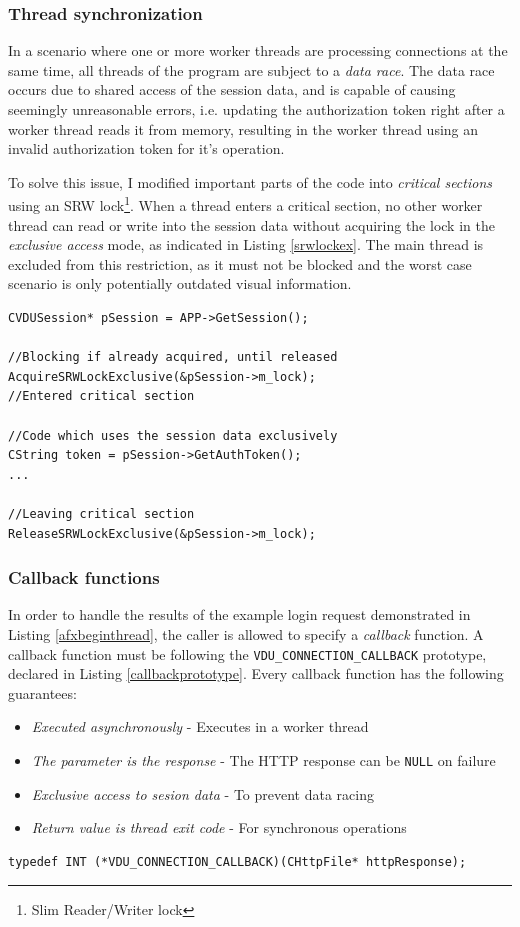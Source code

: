 \subsubsection{Thread synchronization}
In a scenario where one or more worker threads are processing connections at the same time, all threads of the program are subject to a \textit{data race}. The data race occurs due to shared access of the session data, and is capable of causing seemingly unreasonable errors, i.e. updating the authorization token right after a worker thread reads it from memory, resulting in the worker thread using an invalid authorization token for it's operation.

To solve this issue, I modified important parts of the code into \textit{critical sections} using an SRW lock\footnote{Slim Reader/Writer lock}. When a thread enters a critical section, no other worker thread can read or write into the session data without acquiring the lock in the \textit{exclusive access} mode, as indicated in Listing \ref{srwlockex}. The main thread is excluded from this restriction, as it must not be blocked and the worst case scenario is only potentially outdated visual information.

\begin{lstlisting}[caption={Example of a critical section implementation using an SRW lock.}, label=srwlockex]
CVDUSession* pSession = APP->GetSession();

//Blocking if already acquired, until released
AcquireSRWLockExclusive(&pSession->m_lock);
//Entered critical section

//Code which uses the session data exclusively
CString token = pSession->GetAuthToken();
...

//Leaving critical section
ReleaseSRWLockExclusive(&pSession->m_lock);
\end{lstlisting}

\subsubsection{Callback functions}
In order to handle the results of the example login request demonstrated in Listing \ref{afxbeginthread}, the caller is allowed to specify a \textit{callback} function. A callback function must be following the \lstinline{VDU_CONNECTION_CALLBACK} prototype, declared in Listing \ref{callbackprototype}. Every callback function has the following guarantees:
\begin{itemize}
    \item \textit{Executed asynchronously} - Executes in a worker thread 
    \item \textit{The parameter is the response} - The HTTP response can be \lstinline{NULL} on failure
    \item \textit{Exclusive access to sesion data} - To prevent data racing
    \item \textit{Return value is thread exit code} - For synchronous operations
\end{itemize}
\begin{lstlisting}[caption={The prototype of a VDU callback function.}, label=callbackprototype]
typedef INT (*VDU_CONNECTION_CALLBACK)(CHttpFile* httpResponse);
\end{lstlisting}


